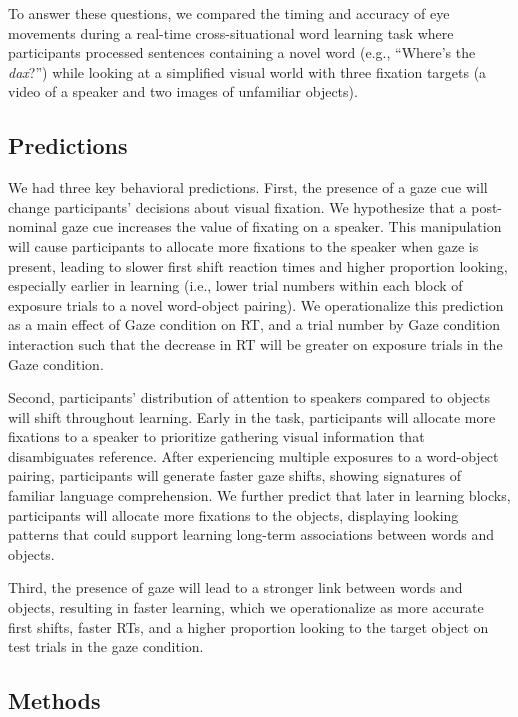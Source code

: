 \documentclass[man,floatsintext]{apa6}
\begin{document}
To answer these questions, we compared the timing and accuracy of eye
movements during a real-time cross-situational word learning task where
participants processed sentences containing a novel word (e.g.,
\enquote{Where's the \emph{dax}?}) while looking at a simplified visual
world with three fixation targets (a video of a speaker and two images
of unfamiliar objects).

\subsection{Predictions}\label{predictions}

We had three key behavioral predictions. First, the presence of a gaze
cue will change participants' decisions about visual fixation. We
hypothesize that a post-nominal gaze cue increases the value of fixating
on a speaker. This manipulation will cause participants to allocate more
fixations to the speaker when gaze is present, leading to slower first
shift reaction times and higher proportion looking, especially earlier
in learning (i.e., lower trial numbers within each block of exposure
trials to a novel word-object pairing). We operationalize this
prediction as a main effect of Gaze condition on RT, and a trial number
by Gaze condition interaction such that the decrease in RT will be
greater on exposure trials in the Gaze condition.

Second, participants' distribution of attention to speakers compared to
objects will shift throughout learning. Early in the task, participants
will allocate more fixations to a speaker to prioritize gathering visual
information that disambiguates reference. After experiencing multiple
exposures to a word-object pairing, participants will generate faster
gaze shifts, showing signatures of familiar language comprehension. We
further predict that later in learning blocks, participants will
allocate more fixations to the objects, displaying looking patterns that
could support learning long-term associations between words and objects.

Third, the presence of gaze will lead to a stronger link between words
and objects, resulting in faster learning, which we operationalize as
more accurate first shifts, faster RTs, and a higher proportion looking
to the target object on test trials in the gaze condition.

\subsection{Methods}\label{methods-2}
\end{document}

